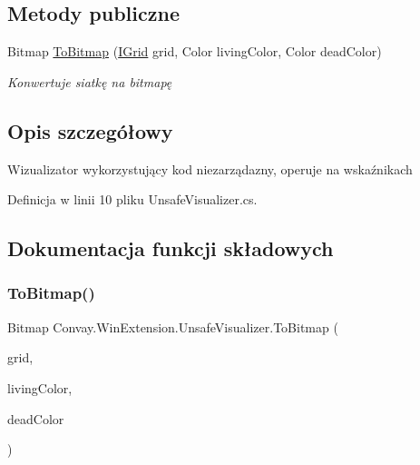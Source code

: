 \subsection*{Metody publiczne}
\begin{DoxyCompactItemize}
\item 
Bitmap \hyperlink{class_convay_1_1_win_extension_1_1_unsafe_visualizer_abbf74d600e673a508b951f59d1fd1860}{To\+Bitmap} (\hyperlink{interface_convay_1_1_core_1_1_interfaces_1_1_i_grid}{I\+Grid} grid, Color living\+Color, Color dead\+Color)
\begin{DoxyCompactList}\small\item\em Konwertuje siatkę na bitmapę \end{DoxyCompactList}\end{DoxyCompactItemize}


\subsection{Opis szczegółowy}
Wizualizator wykorzystujący kod niezarządazny, operuje na wskaźnikach 



Definicja w linii 10 pliku Unsafe\+Visualizer.\+cs.



\subsection{Dokumentacja funkcji składowych}
\hypertarget{class_convay_1_1_win_extension_1_1_unsafe_visualizer_abbf74d600e673a508b951f59d1fd1860}{}\label{class_convay_1_1_win_extension_1_1_unsafe_visualizer_abbf74d600e673a508b951f59d1fd1860} 
\subsubsection{\texorpdfstring{To\+Bitmap()}{ToBitmap()}}
{\footnotesize\ttfamily Bitmap Convay.\+Win\+Extension.\+Unsafe\+Visualizer.\+To\+Bitmap (\begin{DoxyParamCaption}\item[{\hyperlink{interface_convay_1_1_core_1_1_interfaces_1_1_i_grid}{I\+Grid}}]{grid,  }\item[{Color}]{living\+Color,  }\item[{Color}]{dead\+Color }\end{DoxyParamCaption})}



